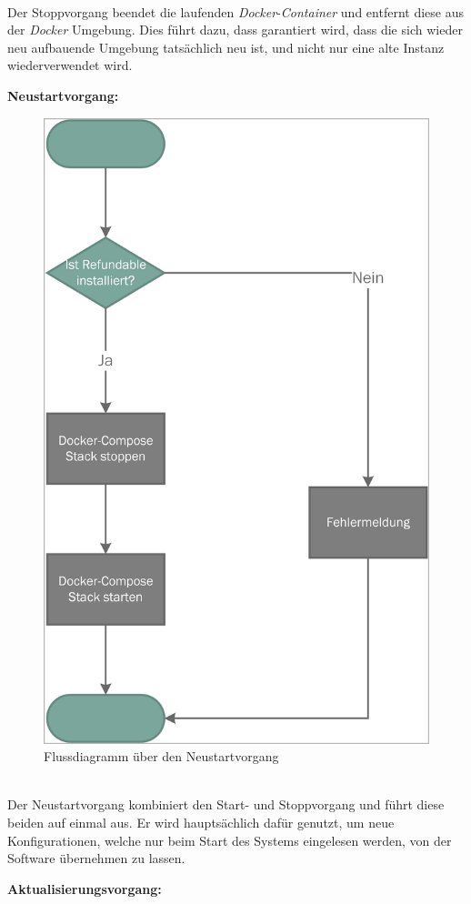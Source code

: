 ~\\
Der Stoppvorgang beendet die laufenden \textit{Docker}-\textit{Container} und entfernt diese aus der \textit{Docker} Umgebung. Dies führt dazu, dass garantiert wird, dass die sich wieder neu aufbauende Umgebung tatsächlich neu ist, und nicht nur eine alte Instanz wiederverwendet wird.

\newpage

\textbf{Neustartvorgang:}

\begin{figure}[H]
	\centering
	\includegraphics[width=0.5\linewidth]{images/mbeier_konzept/Restart_border}
	\caption[Flussdiagramm über den Neustartvorgang]{Flussdiagramm über den Neustartvorgang}
	\label{fig:restart}
\end{figure}
~\\
Der Neustartvorgang kombiniert den Start- und Stoppvorgang und führt diese beiden auf einmal aus. Er wird hauptsächlich dafür genutzt, um neue Konfigurationen, welche nur beim Start des Systems eingelesen werden, von der Software übernehmen zu lassen.

\newpage

\textbf{Aktualisierungsvorgang:}

